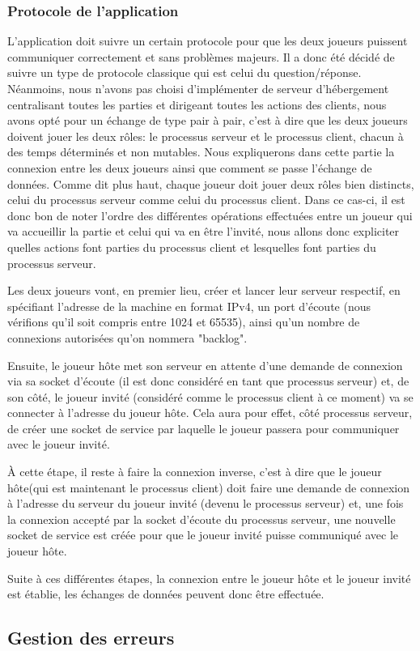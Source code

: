 	\subsubsection{Protocole de l'application}
		L'application doit suivre un certain protocole pour que les deux joueurs puissent communiquer correctement et sans problèmes majeurs. Il a donc été décidé de suivre un type de protocole classique qui est celui du question/réponse. Néanmoins, nous n'avons pas choisi d'implémenter de serveur d'hébergement centralisant toutes les parties et dirigeant toutes les actions des clients, nous avons opté pour un échange de type pair à pair, c'est à dire que les deux joueurs doivent jouer les deux rôles: le processus serveur et le processus client, chacun à des temps déterminés et non mutables. \newline
		Nous expliquerons dans cette partie la connexion entre les deux joueurs ainsi que comment se passe l'échange de données.
			Comme dit plus haut, chaque joueur doit jouer deux rôles bien distincts, celui du processus serveur comme celui du processus client. Dans ce cas-ci, il est donc bon de noter l'ordre des différentes opérations effectuées entre un joueur qui va accueillir la partie et celui qui va en être l'invité, nous allons donc expliciter quelles actions font parties du processus client et lesquelles font parties du processus serveur. \newline
			
			Les deux joueurs vont, en premier lieu, créer et lancer leur serveur respectif, en spécifiant l'adresse de la machine en format IPv4, un port d'écoute (nous vérifions qu'il soit compris entre 1024 et 65535), ainsi qu'un nombre de connexions autorisées qu'on nommera "backlog". \newline
			
			Ensuite, le joueur hôte met son serveur en attente d'une demande de connexion via sa socket d'écoute (il est donc considéré en tant que processus serveur) et, de son côté, le joueur invité (considéré comme le processus client à ce moment) va se connecter à l'adresse du joueur hôte. Cela aura pour effet, côté processus serveur, de créer une socket de service par laquelle le joueur passera pour communiquer avec le joueur invité. \newline
			
			À cette étape, il reste à faire la connexion inverse, c'est à dire que le joueur hôte(qui est maintenant le processus client) doit faire une demande de connexion à l'adresse du serveur du joueur invité (devenu le processus serveur) et, une fois la connexion accepté par la socket d'écoute du processus serveur, une nouvelle socket de service est créée pour que le joueur invité puisse communiqué avec le joueur hôte.\newline
			
			Suite à ces différentes étapes, la connexion entre le joueur hôte et le joueur invité est établie, les échanges de données peuvent donc être effectuée.


\subsection{Gestion des erreurs}